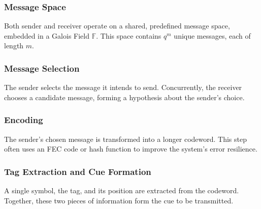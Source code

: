 \documentclass[%
  english,%
  paper=A1,%
  fontsize=22pt,%
  cdfoot=5ex,%
  ddcfoot,%
  BCOR=-20mm,
]{tudscrposter}
\begin{document}
\begin{multicols}{5}
\begin{tcolorbox}[colback=messagespace!30, colframe=messagespace, boxrule=0pt, left=0pt, right=0pt, top=2pt, bottom=2pt, width=\linewidth]
\subsubsection*{Message Space}
\end{tcolorbox}
\vspace{1em}
Both sender and receiver operate on a shared, predefined message space, embedded in a Galois Field $\mathbb{F}$. This space contains $q^m$ unique messages, each of length $m$.

\begin{tcolorbox}[colback=messageselection!30, colframe=messageselection, boxrule=0pt, left=0pt, right=0pt, top=2pt, bottom=2pt, width=\linewidth]
\subsubsection*{Message Selection}
\end{tcolorbox}
The sender selects the message it intends to send. Concurrently, the receiver chooses a candidate message, forming a hypothesis about the sender's choice.
\columnbreak

\begin{tcolorbox}[colback=encoding!30, colframe=encoding, boxrule=0pt, left=0pt, right=0pt, top=2pt, bottom=2pt, width=\linewidth]
\subsubsection*{Encoding}
\end{tcolorbox}
The sender's chosen message is transformed into a longer codeword. This step often uses an FEC code or hash function to improve the system's error resilience.
\columnbreak

\begin{tcolorbox}[colback=tagextraction!30, colframe=tagextraction, boxrule=0pt, left=0pt, right=0pt, top=2pt, bottom=2pt, width=\linewidth]
\subsubsection*{Tag Extraction and Cue Formation}
\end{tcolorbox}
A single symbol, the tag, and its position are extracted from the codeword. Together, these two pieces of information form the cue to be transmitted.
\columnbreak


\end{multicols}
\end{document}

